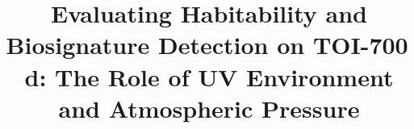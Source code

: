 
\graphicspath{{./}{figures/}}



\title{Evaluating Habitability and Biosignature Detection on TOI-700\,d: The Role of UV Environment and Atmospheric Pressure}


